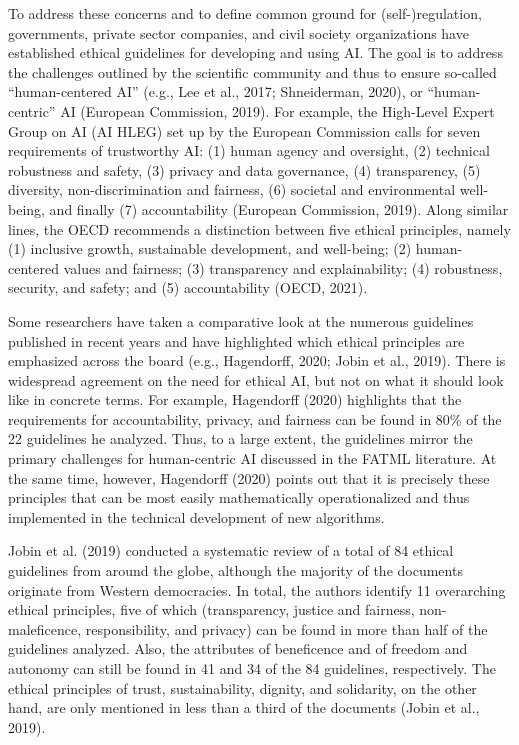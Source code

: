 \documentclass{article}
\begin{document}
To address these concerns and to define common ground for
(self-)regulation, governments, private sector companies, and civil
society organizations have established ethical guidelines for developing
and using AI. The goal is to address the challenges outlined by the
scientific community and thus to ensure so-called ``human-centered AI''
(e.g., Lee et al., 2017; Shneiderman, 2020), or ``human-centric'' AI
(European Commission, 2019). For example, the High-Level Expert Group on
AI (AI HLEG) set up by the European Commission calls for seven
requirements of trustworthy AI: (1) human agency and oversight, (2)
technical robustness and safety, (3) privacy and data governance, (4)
transparency, (5) diversity, non-discrimination and fairness, (6)
societal and environmental well-being, and finally (7) accountability
(European Commission, 2019). Along similar lines, the OECD recommends a
distinction between five ethical principles, namely (1) inclusive
growth, sustainable development, and well-being; (2) human-centered
values and fairness; (3) transparency and explainability; (4)
robustness, security, and safety; and (5) accountability (OECD, 2021).

Some researchers have taken a comparative look at the numerous
guidelines published in recent years and have highlighted which ethical
principles are emphasized across the board (e.g., Hagendorff, 2020;
Jobin et al., 2019). There is widespread agreement on the need for
ethical AI, but not on what it should look like in concrete terms. For
example, Hagendorff (2020) highlights that the requirements for
accountability, privacy, and fairness can be found in 80\% of the 22
guidelines he analyzed. Thus, to a large extent, the guidelines mirror
the primary challenges for human-centric AI discussed in the FATML
literature. At the same time, however, Hagendorff (2020) points out that
it is precisely these principles that can be most easily mathematically
operationalized and thus implemented in the technical development of new
algorithms.

Jobin et al. (2019) conducted a systematic review of a total of 84
ethical guidelines from around the globe, although the majority of the
documents originate from Western democracies. In total, the authors
identify 11 overarching ethical principles, five of which (transparency,
justice and fairness, non-maleficence, responsibility, and privacy) can
be found in more than half of the guidelines analyzed. Also, the
attributes of beneficence and of freedom and autonomy can still be found
in 41 and 34 of the 84 guidelines, respectively. The ethical principles
of trust, sustainability, dignity, and solidarity, on the other hand,
are only mentioned in less than a third of the documents (Jobin et al.,
2019).
\end{document}
